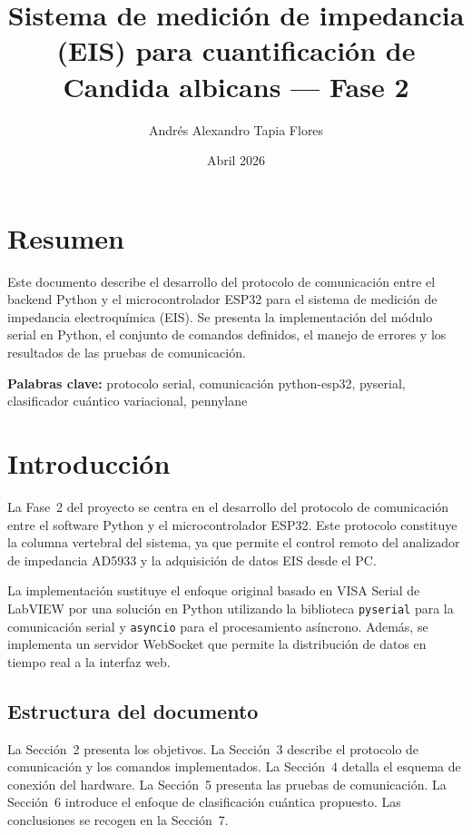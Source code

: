 \documentclass[11pt,a4paper,spanish]{book}
\title{Sistema de medici\'{o}n de impedancia (EIS) para cuantificaci\'{o}n de Candida albicans --- Fase 2}
\author{Andr\'{e}s Alexandro Tapia Flores}
\date{Abril 2026}
\begin{document}
\renewcommand{\listfigurename}{\'{I}ndice de figuras}
\renewcommand{\contentsname}{\'{I}ndice de contenidos}
\renewcommand{\figurename}{Figura}
\renewcommand{\tablename}{Tabla}

\maketitle
\frontmatter
\tableofcontents

\chapter{Resumen}
Este documento describe el desarrollo del protocolo de comunicaci\'{o}n entre el backend Python y el microcontrolador ESP32 para el sistema de medici\'{o}n de impedancia electroqu\'{i}mica (EIS). Se presenta la implementaci\'{o}n del m\'{o}dulo serial en Python, el conjunto de comandos definidos, el manejo de errores y los resultados de las pruebas de comunicaci\'{o}n.

\vspace{0.5cm}
{\bf Palabras clave:} protocolo serial, comunicaci\'{o}n python-esp32, pyserial, clasificador cu\'{a}ntico variacional, pennylane

\mainmatter

\chapter{Introducci\'{o}n}

La Fase~2 del proyecto se centra en el desarrollo del protocolo de comunicaci\'{o}n entre el software Python y el microcontrolador ESP32. Este protocolo constituye la columna vertebral del sistema, ya que permite el control remoto del analizador de impedancia AD5933 y la adquisici\'{o}n de datos EIS desde el PC.

La implementaci\'{o}n sustituye el enfoque original basado en VISA Serial de LabVIEW por una soluci\'{o}n en Python utilizando la biblioteca \texttt{pyserial} para la comunicaci\'{o}n serial y \texttt{asyncio} para el procesamiento as\'{i}ncrono. Adem\'{a}s, se implementa un servidor WebSocket que permite la distribuci\'{o}n de datos en tiempo real a la interfaz web.

\section{Estructura del documento}
La Secci\'{o}n~2 presenta los objetivos. La Secci\'{o}n~3 describe el protocolo de comunicaci\'{o}n y los comandos implementados. La Secci\'{o}n~4 detalla el esquema de conexi\'{o}n del hardware. La Secci\'{o}n~5 presenta las pruebas de comunicaci\'{o}n. La Secci\'{o}n~6 introduce el enfoque de clasificaci\'{o}n cu\'{a}ntica propuesto. Las conclusiones se recogen en la Secci\'{o}n~7.
\end{document}
